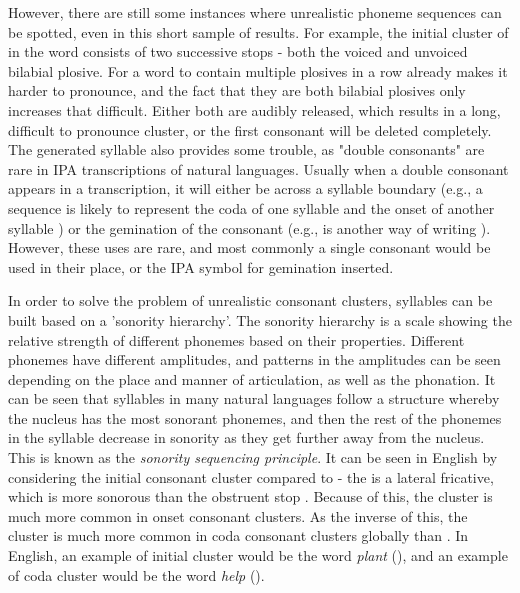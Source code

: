 \documentclass{report}
\begin{document}
	However, there are still some instances where unrealistic phoneme sequences can be spotted, even in this short sample of results. For example, the initial cluster of  in the word  consists of two successive stops - both the voiced and unvoiced bilabial plosive. For a word to contain multiple plosives in a row already makes it harder to pronounce, and the fact that they are both bilabial plosives only increases that difficult. Either both are audibly released, which results in a long, difficult to pronounce cluster, or the first consonant will be deleted completely. The generated syllable  also provides some trouble, as "double consonants" are rare in IPA transcriptions of natural languages. Usually when a double consonant appears in a transcription, it will either be across a syllable boundary (e.g., a sequence  is likely to represent the coda of one syllable and the onset of another syllable ) or the gemination of the consonant (e.g.,  is another way of writing ). However, these uses are rare, and most commonly a single consonant would be used in their place, or the IPA symbol for gemination inserted.
	
	In order to solve the problem of unrealistic consonant clusters, syllables can be built based on a 'sonority hierarchy'. The sonority hierarchy is a scale showing the relative strength of different phonemes based on their properties\cite{burquest2006}. Different phonemes have different amplitudes, and patterns in the amplitudes can be seen depending on the place and manner of articulation, as well as the phonation. It can be seen that syllables in many natural languages follow a structure whereby the nucleus has the most sonorant phonemes, and then the rest of the phonemes in the syllable decrease in sonority as they get further away from the nucleus. This is known as the \textit{sonority sequencing principle}. It can be seen in English by considering the initial consonant cluster  compared to  - the  is a lateral fricative, which is more sonorous than the obstruent stop . Because of this, the cluster  is much more common in onset consonant clusters. As the inverse of this, the cluster  is much more common in coda consonant clusters globally than . In English, an example of initial cluster  would be the word \textit{plant} (), and an example of coda cluster  would be the word \textit{help} ().
	
\end{document}
